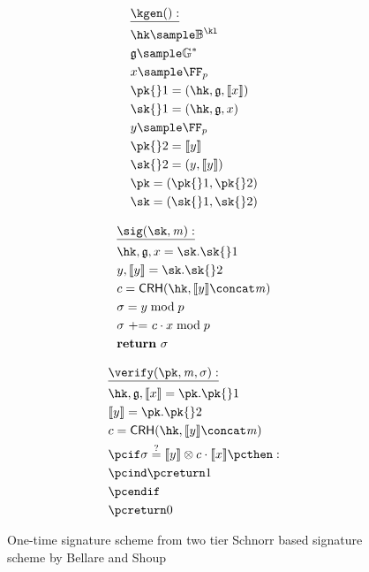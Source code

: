 \begin{figure*}[ht]
    \begin{minipage}[t]{0.33\textwidth}
        \begin{align*}
            & \underline{\kgen():} \\
            & \hk \sample \BB^{\kl} \\
            & \ggen \sample \gset^* \\
            & x \sample \FFx{p} \\
            & \pk{}1 = (\hk, \ggen, \groupenc{x}) \\
            & \sk{}1 = (\hk, \ggen, x) \\
            & y \sample \FFx{p} \\
            & \pk{}2 =  \groupenc{y} \\
            & \sk{}2 = (y, \groupenc{y}) \\
            & \pk = (\pk{}1, \pk{}2) \\
            & \sk = (\sk{}1, \sk{}2) \\
        \end{align*}
    \end{minipage}%
    \begin{minipage}[t]{0.33\textwidth}
        \begin{align*}
            & \underline{\sig(\sk, \msg):}\\
            & \hk, \ggen, x = \sk.\sk{}1 \\
            & y, \groupenc{y} = \sk.\sk{}2 \\
            & c = \crh(\hk, \groupenc{y} \concat \msg) \\
            & \sigma = y \bmod p \\
            & \sigma\ \text{+=}\ c \cdot x \bmod p \\
            & \textbf{return}\ \sigma
        \end{align*}
    \end{minipage}%
    \begin{minipage}[t]{0.33\textwidth}
        \begin{align*}
        & \underline{\verify(\pk, \msg, \sigma):}\\
        &  \hk, \ggen, \groupenc{x} = \pk.\pk{}1 \\
        &  \groupenc{y} = \pk.\pk{}2 \\
        &  c = \crh(\hk, \groupenc{y} \concat \msg)\\
        &  \pcif \sigma \iseq \groupenc{y} \otimes c \cdot \groupenc{x} \pcthen: \\
        &  \pcind \pcreturn 1\\
        &  \pcendif \\
        &  \pcreturn 0
        \end{align*}
    \end{minipage}
\caption{One-time signature scheme from two tier Schnorr based signature scheme by Bellare and Shoup~\cite{bellare2007two}}\label{instantiation:fig:ots-from-two-tier-sig}
\end{figure*}

